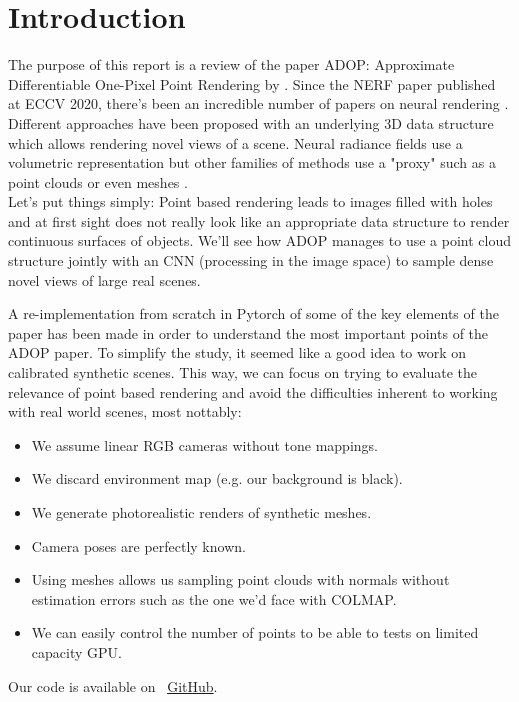 \section{Introduction}
\label{sec:intro}
The purpose of this report is a review of the paper ADOP: Approximate Differentiable One-Pixel Point Rendering by \citet{ruckert2022adop}. 
Since the NERF paper published at ECCV 2020, there's been an incredible number of papers on neural rendering . Different approaches have been proposed with an underlying 3D data structure which allows rendering novel views of a scene. Neural radiance fields use a volumetric representation but other families of methods use a "proxy" such as a point clouds \cite{Aliev2020} or even meshes \cite{worchel2022nds}. \\
Let's put things simply: Point based rendering leads to images filled with holes and at first sight does not really look like an appropriate data structure to render continuous surfaces of objects.
We'll see how ADOP manages to use a point cloud structure jointly with an CNN (processing in the image space) to sample dense novel views of large real scenes.

A re-implementation from scratch in Pytorch of some of the key elements of the paper has been made in order to understand the most important points of the ADOP paper. To simplify the study, it seemed like a good idea to work on calibrated synthetic scenes. This way, we can focus on trying to evaluate the relevance of point based rendering and avoid the difficulties inherent to working with real world scenes, most nottably:
\begin{itemize}
    \item We assume linear RGB cameras without tone mappings.
    \item We discard environment map (e.g. our background is black).
    \item We generate photorealistic renders of synthetic meshes. 
    \item Camera poses are perfectly known.
    \item Using meshes allows us sampling point clouds with normals without estimation errors such as the one we'd face with COLMAP.
    \item We can easily control the number of points to be able to tests on limited capacity GPU.
\end{itemize}

\noindent Our code is available on ~\href{https://github.com/balthazarneveu/per-pixel-point-rendering}{GitHub}.
